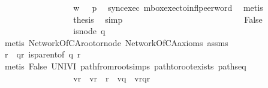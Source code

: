 \begin{isabellebody}
\isanewline
\ \ \ \ \ \ \ \ \ \ \ \ \ \ \isamarkupfalse%
\ \isamarkupfalse%
\ {\isachardoublequoteopen}{\isacharquery}{\kern0pt}w{\isacharprime}{\kern0pt}\ {\isasymin}\ {\isasymL}\isactrlsup {\isacharasterisk}{\kern0pt}\ p{\isachardoublequoteclose}\ \isamarkupfalse%
\ sync{\isacharunderscore}{\kern0pt}exec\ mbox{\isacharunderscore}{\kern0pt}exec{\isacharunderscore}{\kern0pt}to{\isacharunderscore}{\kern0pt}infl{\isacharunderscore}{\kern0pt}peer{\isacharunderscore}{\kern0pt}word\ \isamarkupfalse%
\ metis\isanewline
\ \ \ \ \ \ \ \ \ \ \ \ \ \ \isamarkupfalse%
\ \isamarkupfalse%
\ {\isacharquery}{\kern0pt}thesis\ \isamarkupfalse%
\ simp\isanewline
\ \ \ \ \ \ \ \ \ \ \ \ \isamarkupfalse%
\isanewline
\ \ \ \ \ \ \ \ \ \ \ \ \ \ \isamarkupfalse%
\ False\ \isanewline
\ \ \ \ \ \ \ \ \ \ \ \ \ \ \isamarkupfalse%
\ \isamarkupfalse%
\ {\isachardoublequoteopen}is{\isacharunderscore}{\kern0pt}node\ q{\isachardoublequoteclose}\ \isamarkupfalse%
\ {\isacharparenleft}{\kern0pt}metis\ NetworkOfCA{\isachardot}{\kern0pt}root{\isacharunderscore}{\kern0pt}or{\isacharunderscore}{\kern0pt}node\ NetworkOfCA{\isacharunderscore}{\kern0pt}axioms\ assms{\isacharparenright}{\kern0pt}\isanewline
\ \ \ \ \ \ \ \ \ \ \ \ \ \ \isamarkupfalse%
\ \isamarkupfalse%
\ r\ \ qr{\isacharcolon}{\kern0pt}\ {\isachardoublequoteopen}is{\isacharunderscore}{\kern0pt}parent{\isacharunderscore}{\kern0pt}of\ q\ r{\isachardoublequoteclose}\ \isamarkupfalse%
\ {\isacharparenleft}{\kern0pt}metis\ False\ UNIV{\isacharunderscore}{\kern0pt}I\ path{\isacharunderscore}{\kern0pt}from{\isacharunderscore}{\kern0pt}root{\isachardot}{\kern0pt}simps\ path{\isacharunderscore}{\kern0pt}to{\isacharunderscore}{\kern0pt}root{\isacharunderscore}{\kern0pt}exists\ paths{\isacharunderscore}{\kern0pt}eq{\isacharparenright}{\kern0pt}\isanewline
\ \ \ \ \ \ \ \ \ \ \ \ \ \ \isamarkupfalse%
\ \isamarkupfalse%
\ {\isachardoublequoteopen}{\isasymexists}vr{\isachardot}{\kern0pt}\ \ vr\ {\isasymin}\ {\isasymL}\isactrlsup {\isacharasterisk}{\kern0pt}{\isacharparenleft}{\kern0pt}r{\isacharparenright}{\kern0pt}\ {\isasymand}\ {\isacharparenleft}{\kern0pt}{\isacharparenleft}{\kern0pt}vq{\isasymdown}\isactrlsub {\isacharquery}{\kern0pt}{\isacharparenright}{\kern0pt}{\isasymdown}\isactrlsub {\isacharbang}{\kern0pt}\isactrlsub {\isacharquery}{\kern0pt}{\isacharparenright}{\kern0pt}\ {\isacharequal}{\kern0pt}\ {\isacharparenleft}{\kern0pt}{\isacharparenleft}{\kern0pt}{\isacharparenleft}{\kern0pt}vr{\isasymdown}\isactrlsub {\isacharbraceleft}{\kern0pt}\isactrlsub q\isactrlsub {\isacharcomma}{\kern0pt}\isactrlsub r\isactrlsub {\isacharbraceright}{\kern0pt}{\isacharparenright}{\kern0pt}{\isasymdown}\isactrlsub {\isacharbang}{\kern0pt}{\isacharparenright}{\kern0pt}{\isasymdown}\isactrlsub {\isacharbang}{\kern0pt}\isactrlsub {\isacharquery}{\kern0pt}{\isacharparenright}{\kern0pt}{\isachardoublequoteclose}\isanewline

\end{isabellebody}
